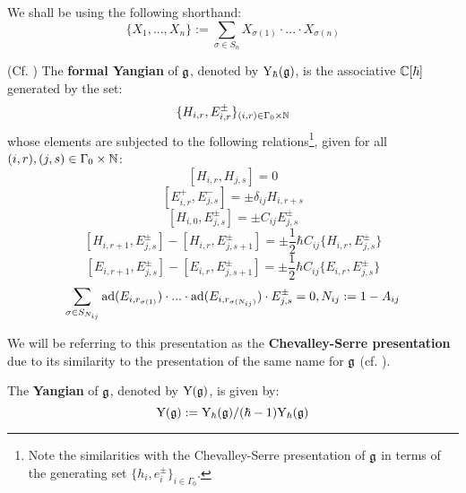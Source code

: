             \begin{convention}
                We shall be using the following shorthand:
                    $$\{ X_1, ..., X_n \} := \sum_{\sigma \in S_n} X_{\sigma(1)} \cdot ... \cdot X_{\sigma(n)}$$
            \end{convention}
            \begin{definition} \label{def: formal_finite_type_yangians}
                (Cf. \cite[Definition 2.1]{guay_nakajima_wendlandt_affine_yangian_coproduct}) The \textbf{formal Yangian} of $\mathfrak{g}$, denoted by $\mathrm{Y}_{\hbar}(\mathfrak{g})$, is the associative $\mathbb{C}[\hbar]$ generated by the set:
                    $$\{ H_{i, r}, E_{i, r}^{\pm} \}_{(i, r) \in \Gamma_0 \x \N}$$
                whose elements are subjected to the following relations\footnote{Note the similarities with the Chevalley-Serre presentation of $\mathfrak{g}$ in terms of the generating set $\{ h_i, e_i^{\pm} \}_{i \in \Gamma_0}$.}, given for all $(i, r), (j, s) \in \Gamma_0 \x \N$:
                    $$[ H_{i, r}, H_{j, s} ] = 0$$
                    $$[ E_{i, r}^+, E_{j, s}^- ] = \pm \delta_{ij} H_{i, r + s}$$
                    $$[ H_{i, 0}, E_{j, s}^{\pm} ] = \pm C_{ij} E_{j, s}^{\pm}$$
                    $$[ H_{i, r + 1}, E_{j, s}^{\pm} ] - [ H_{i, r}, E_{j, s + 1}^{\pm} ] = \pm \frac12 \hbar C_{ij} \{H_{i, r}, E_{j, s}^{\pm}\}$$
                    $$[ E_{i, r + 1}, E_{j, s}^{\pm} ] - [ E_{i, r}, E_{j, s + 1}^{\pm} ] = \pm \frac12 \hbar C_{ij} \{E_{i, r}, E_{j, s}^{\pm}\}$$
                    $$\sum_{\sigma \in S_{N_{ij}}} \mathrm{ad}(E_{i, r_{\sigma(1)}}) \cdot ... \cdot \mathrm{ad}(E_{i, r_{\sigma(N_{ij})}}) \cdot E_{j, s}^{\pm} = 0, N_{ij} := 1 - A_{ij}$$
                    
                We will be referring to this presentation as the \textbf{Chevalley-Serre presentation} due to its similarity to the presentation of the same name for $\mathfrak{g}$ (cf. \cite[Section 8]{humphreys_lie_algebras}). 
            \end{definition}
            \begin{definition}[Yangians] \label{def: finite_type_yangians}
                The \textbf{Yangian} of $\mathfrak{g}$, denoted by $\mathrm{Y}(\mathfrak{g})$, is given by:
                    $$\mathrm{Y}(\mathfrak{g}) := \mathrm{Y}_{\hbar}(\mathfrak{g})/(\hbar - 1)\mathrm{Y}_{\hbar}(\mathfrak{g})$$
            \end{definition}
